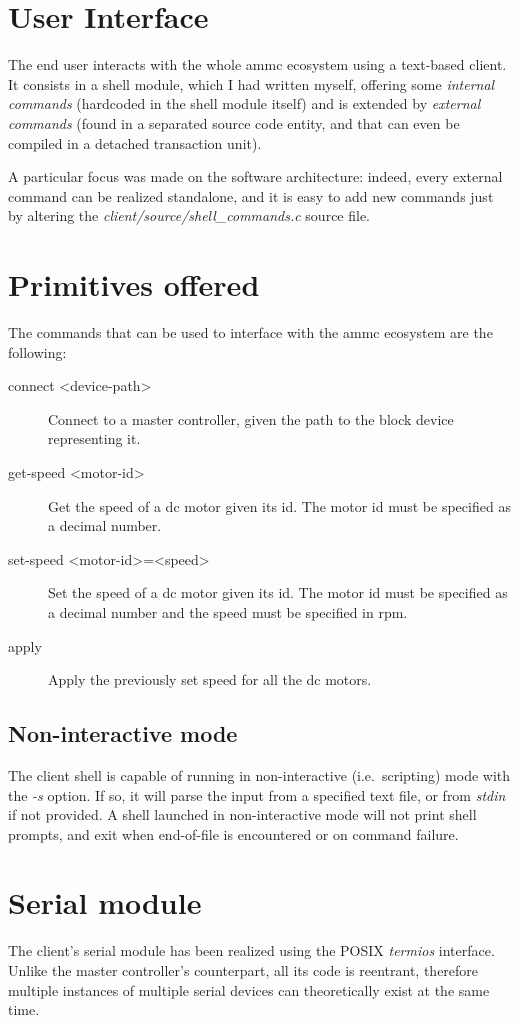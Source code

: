 \documentclass[binding=0.6cm,Lau]{sapthesis}
\begin{document}
\section{User Interface}
The end user interacts with the whole ammc ecosystem using a text-based client.
It consists in a shell module, which I had written myself, offering some
\emph{internal commands} (hardcoded in the shell module itself) and is extended
by \emph{external commands} (found in a separated source code entity, and that
can even be compiled in a detached transaction unit).

A particular focus was made on the software architecture: indeed, every
external command can be realized standalone, and it is easy to add new
commands just by altering the \emph{client/source/shell\_commands.c} source
file.

\section{Primitives offered}
The commands that can be used to interface with the ammc ecosystem are the
following:
\begin{description}
  \item[connect <device-path>] Connect to a master controller, given the path
    to the block device representing it.
  \item[get-speed <motor-id>] Get the speed of a dc motor given its id.
    The motor id must be specified as a decimal number.
  \item[set-speed <motor-id>=<speed>] Set the speed of a dc motor given its id.
    The motor id must be specified as a decimal number and the speed must be
    specified in rpm.
  \item[apply] Apply the previously set speed for all the dc motors.
\end{description}

\subsection{Non-interactive mode}
The client shell is capable of running in non-interactive (i.e.\ scripting)
mode with the \emph{-s} option.  If so, it will parse the input from a
specified text file, or from \emph{stdin} if not provided.  A shell launched in
non-interactive mode will not print shell prompts, and exit when end-of-file is
encountered or on command failure.

\section{Serial module}
The client's serial module has been realized using the POSIX \emph{termios}
interface. Unlike the master controller's counterpart, all its code is
reentrant, therefore multiple instances of multiple serial devices can
theoretically exist at the same time.
\end{document}
